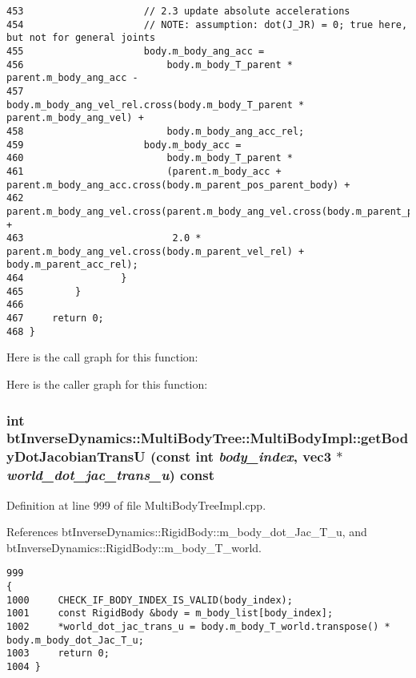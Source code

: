 \begin{Code}
\begin{verbatim}
453                     // 2.3 update absolute accelerations
454                     // NOTE: assumption: dot(J_JR) = 0; true here, but not for general joints
455                     body.m_body_ang_acc =
456                         body.m_body_T_parent * parent.m_body_ang_acc -
457                         body.m_body_ang_vel_rel.cross(body.m_body_T_parent * parent.m_body_ang_vel) +
458                         body.m_body_ang_acc_rel;
459                     body.m_body_acc =
460                         body.m_body_T_parent *
461                         (parent.m_body_acc + parent.m_body_ang_acc.cross(body.m_parent_pos_parent_body) +
462                          parent.m_body_ang_vel.cross(parent.m_body_ang_vel.cross(body.m_parent_pos_parent_body)) +
463                          2.0 * parent.m_body_ang_vel.cross(body.m_parent_vel_rel) + body.m_parent_acc_rel);
464                 }
465         }
466 
467     return 0;
468 }
\end{verbatim}
\end{Code}




Here is the call graph for this function:

Here is the caller graph for this function:\hypertarget{classbt_inverse_dynamics_1_1_multi_body_tree_1_1_multi_body_impl_3121da37900effff77e309b2c5a2cd16}{
\subsubsection[getBodyDotJacobianTransU]{\setlength{\rightskip}{0pt plus 5cm}int btInverseDynamics::MultiBodyTree::MultiBodyImpl::getBodyDotJacobianTransU (const int {\em body\_\-index}, \/  {\bf vec3} $\ast$ {\em world\_\-dot\_\-jac\_\-trans\_\-u}) const}}
\label{classbt_inverse_dynamics_1_1_multi_body_tree_1_1_multi_body_impl_3121da37900effff77e309b2c5a2cd16}


 

Definition at line 999 of file MultiBodyTreeImpl.cpp.

References btInverseDynamics::RigidBody::m\_\-body\_\-dot\_\-Jac\_\-T\_\-u, and btInverseDynamics::RigidBody::m\_\-body\_\-T\_\-world.

\begin{Code}\begin{verbatim}999                                                                                                                  {
1000     CHECK_IF_BODY_INDEX_IS_VALID(body_index);
1001     const RigidBody &body = m_body_list[body_index];
1002     *world_dot_jac_trans_u = body.m_body_T_world.transpose() * body.m_body_dot_Jac_T_u;
1003     return 0;
1004 }
\end{verbatim}
\end{Code}


